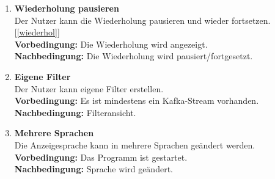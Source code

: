 \begin{enumerate}[label=\textbf{WF\arabic{enumi}0}]
	\item \textbf{Wiederholung pausieren}\\
		Der Nutzer kann die Wiederholung pausieren und wieder fortsetzen. [\ref{wiederhol}]\\
		\textbf{Vorbedingung:} Die Wiederholung wird angezeigt.\\
		\textbf{Nachbedingung:} Die Wiederholung wird pausiert/fortgesetzt.\\
	
	\item \textbf{Eigene Filter}\\
		Der Nutzer kann eigene Filter erstellen.\\
		\textbf{Vorbedingung:} Es ist mindestens ein Kafka-Stream vorhanden.\\
		\textbf{Nachbedingung:} Filteransicht.\\
		
	\item \textbf{Mehrere Sprachen}\\
		Die Anzeigesprache kann in mehrere Sprachen geändert werden.\\
		\textbf{Vorbedingung:} Das Programm ist gestartet.\\
		\textbf{Nachbedingung:} Sprache wird geändert.\\

\end{enumerate}
